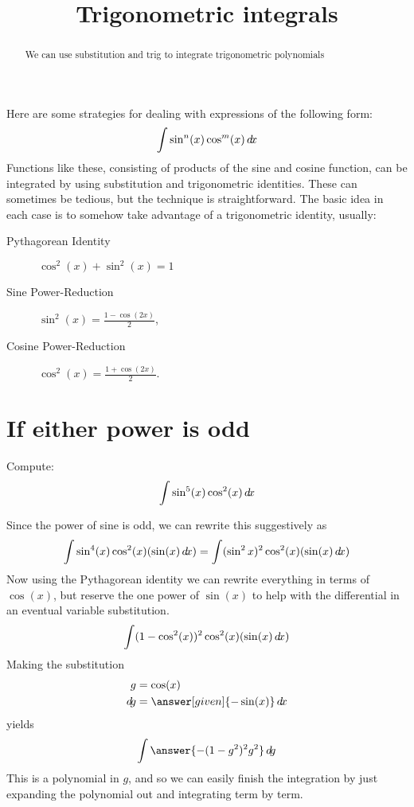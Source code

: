 \documentclass{ximera}
\title[Dig-In:]{Trigonometric integrals}
\begin{document}
\begin{abstract}
  We can use substitution and trig to integrate trigonometric polynomials
\end{abstract}
\maketitle

Here are some strategies for dealing with expressions of the following form:
\[
\int \sin^n(x)\cos^m(x) \mathop{}\!d\! x
\]
Functions like these, consisting of products of the sine and cosine
function, can be integrated by using substitution and trigonometric
identities. These can sometimes be tedious, but the technique is
straightforward. The basic idea in each case is to somehow take
advantage of a trigonometric identity, usually:
\begin{description}
\item[Pythagorean Identity] $\cos^2(x) + \sin^2(x) = 1$
\item[Sine Power-Reduction] $\sin^2(x) = \frac{1-\cos(2x)}{2}$,
\item[Cosine Power-Reduction] $\cos^2(x)= \frac{1+\cos(2x)}{2}$.
\end{description}

\section{If either power is odd}

\begin{example}
  Compute:
  \[
  \int \sin^5(x) \cos^2(x) \mathop{}\!d\! x
  \]
  \begin{explanation}
    Since the power of sine is odd, we can rewrite this suggestively as
    \[
    \int \sin^4(x) \cos^2(x) (\sin(x) \mathop{}\!d\! x) = \int (\sin^2x)^2 \cos^2(x) (\sin(x) \mathop{}\!d\! x)
    \]
    Now using the Pythagorean identity we can rewrite everything in
    terms of $\cos(x)$, but reserve the one power of $\sin(x)$ to help
    with the differential in an eventual variable substitution.
    \[
    \int (1-\cos^2(x))^2 \cos^2(x) (\sin(x) \mathop{}\!d\! x)
    \]
    Making the substitution
    \begin{align*}
      g &= \cos(x)\\
      \d g &=\answer[given]{-\sin(x)} \d x
    \end{align*}
    yields
    \[
    \int \answer{-(1-g^2)^2 g^2} \d g
    \]
    This is a polynomial in $g$, and so we can easily finish the
    integration by just expanding the polynomial out and integrating
    term by term.
  \end{explanation}
\end{example}
\end{document}
